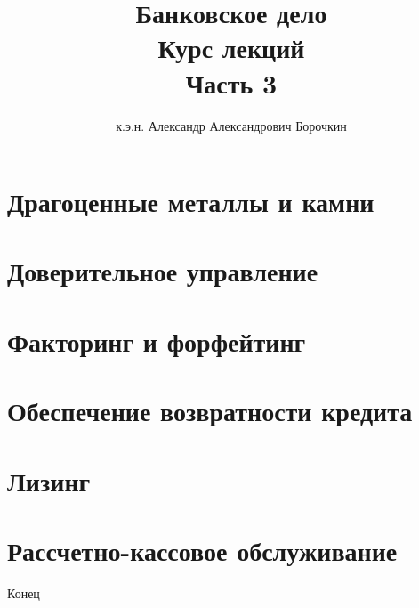 \documentclass[12pt]{beamer}
\title[Банковское дело]{Банковское дело\\Курс лекций\\Часть 3}
\author{к.э.н. Александр Александрович Борочкин}
\institute{Нижегородский государственный университет}
\date{\the\year}
\begin{document}
\begin{frame}
\titlepage
\end{frame}
\section{Драгоценные металлы и камни}


\section{Доверительное управление}


\section{Факторинг и форфейтинг}


\section{Обеспечение возвратности кредита}


\section{Лизинг}


\section{Рассчетно-кассовое обслуживание}



\begin{frame}
\begin{center}
\huge{Конец}
\end{center}
\end{frame}
\end{document}
